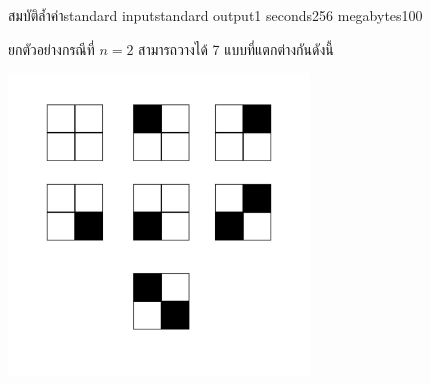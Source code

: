 \documentclass[11pt,a4paper]{article}
\begin{document}
\begin{problem}{สมบัติล้ำค่า}{standard input}{standard output}{1 seconds}{256 megabytes}{100}
\Note
\begin{note}
ยกตัวอย่างกรณีที่ $n = 2$ สามารถวางได้ 7 แบบที่แตกต่างกันดังนี้

\begin{center}
\includegraphics[width=8cm]{Sample.jpg}
\end{center}

\end{note}

\end{problem}

\pagebreak
\end{document}

